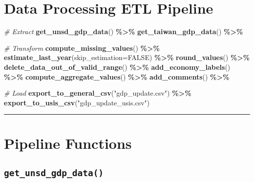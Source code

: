 \documentclass[
]{book}
\newenvironment{Shaded}{\begin{snugshade}}{\end{snugshade}}
\newcommand{\AttributeTok}[1]{\textcolor[rgb]{0.13,0.29,0.53}{#1}}
\newcommand{\CommentTok}[1]{\textcolor[rgb]{0.56,0.35,0.01}{\textit{#1}}}
\newcommand{\ConstantTok}[1]{\textcolor[rgb]{0.56,0.35,0.01}{#1}}
\newcommand{\FunctionTok}[1]{\textcolor[rgb]{0.13,0.29,0.53}{\textbf{#1}}}
\newcommand{\NormalTok}[1]{#1}
\newcommand{\SpecialCharTok}[1]{\textcolor[rgb]{0.81,0.36,0.00}{\textbf{#1}}}
\newcommand{\StringTok}[1]{\textcolor[rgb]{0.31,0.60,0.02}{#1}}
\begin{document}
\section{Data Processing ETL Pipeline}\label{data-processing-etl-pipeline}

\begin{Shaded}
\begin{Highlighting}[]
  \CommentTok{\# Extract }
\FunctionTok{get\_unsd\_gdp\_data}\NormalTok{() }\SpecialCharTok{\%\textgreater{}\%}
  \FunctionTok{get\_taiwan\_gdp\_data}\NormalTok{() }\SpecialCharTok{\%\textgreater{}\%}
  
  \CommentTok{\# Transform}
  \FunctionTok{compute\_missing\_values}\NormalTok{() }\SpecialCharTok{\%\textgreater{}\%}
  \FunctionTok{estimate\_last\_year}\NormalTok{(}\AttributeTok{skip\_estimation=}\ConstantTok{FALSE}\NormalTok{) }\SpecialCharTok{\%\textgreater{}\%}
  \FunctionTok{round\_values}\NormalTok{() }\SpecialCharTok{\%\textgreater{}\%}
  \FunctionTok{delete\_data\_out\_of\_valid\_range}\NormalTok{() }\SpecialCharTok{\%\textgreater{}\%}
  \FunctionTok{add\_economy\_labels}\NormalTok{() }\SpecialCharTok{\%\textgreater{}\%}
  \FunctionTok{compute\_aggregate\_values}\NormalTok{() }\SpecialCharTok{\%\textgreater{}\%}
  \FunctionTok{add\_comments}\NormalTok{() }\SpecialCharTok{\%\textgreater{}\%}
  
  \CommentTok{\# Load}
  \FunctionTok{export\_to\_general\_csv}\NormalTok{(}\StringTok{"gdp\_update.csv"}\NormalTok{) }\SpecialCharTok{\%\textgreater{}\%}
  \FunctionTok{export\_to\_usis\_csv}\NormalTok{(}\StringTok{"gdp\_update\_usis.csv"}\NormalTok{)}
\end{Highlighting}
\end{Shaded}

\begin{center}\rule{0.5\linewidth}{0.5pt}\end{center}

\section{Pipeline Functions}\label{pipeline-functions}

\subsection*{\texorpdfstring{\texttt{get\_unsd\_gdp\_data()}}{get\_unsd\_gdp\_data()}}\label{get_unsd_gdp_data}
\end{document}
